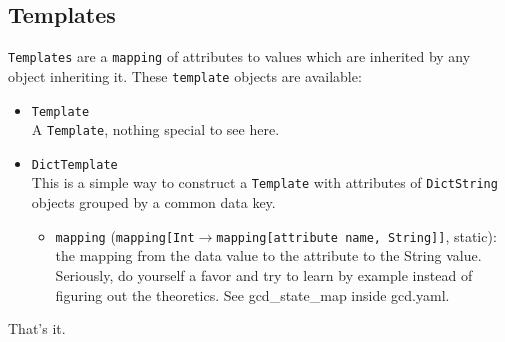 \documentclass[11pt]{article}
\begin{document}
\subsection {Templates}
\texttt{Templates} are a \texttt{mapping} of attributes to values which are inherited by any object inheriting it. These \texttt{template} objects are available:
\begin{itemize}
  \item \texttt{Template} \\
  A \texttt{Template}, nothing special to see here.
  \item \texttt{DictTemplate} \\
  This is a simple way to construct a \texttt{Template} with attributes of \texttt{DictString} objects grouped by a common data key.
  \begin{itemize}
    \item \texttt{mapping} (\texttt{mapping[Int$\rightarrow$mapping[attribute name, String]]}, static): the mapping from the data value to the attribute to the String value. Seriously, do yourself a favor and try to learn by example instead of figuring out the theoretics. See gcd\_state\_map inside gcd.yaml.
  \end{itemize}
\end{itemize}

That's it.
\end{document}
